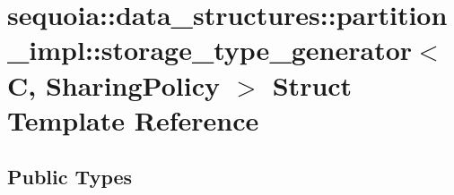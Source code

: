 \hypertarget{structsequoia_1_1data__structures_1_1partition__impl_1_1storage__type__generator}{}\section{sequoia\+::data\+\_\+structures\+::partition\+\_\+impl\+::storage\+\_\+type\+\_\+generator$<$ C, Sharing\+Policy $>$ Struct Template Reference}
\label{structsequoia_1_1data__structures_1_1partition__impl_1_1storage__type__generator}
\subsection*{Public Types}

